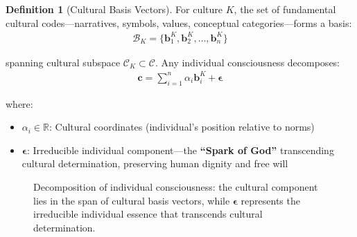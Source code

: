 \documentclass[11pt,a4paper]{article}
\theoremstyle{definition}
\newtheorem{definition}{Definition}[section]
\theoremstyle{remark}
\newcommand{\RR}{\mathbb{R}}
\newcommand{\CC}{\mathcal{C}}
\newcommand{\bb}{\mathbf{b}}
\newcommand{\cc}{\mathbf{c}}
\begin{document}
\begin{definition}[Cultural Basis Vectors]
For culture \(K\), the set of fundamental cultural codes—narratives, symbols, values, conceptual categories—forms a basis:
\begin{align}
\mathcal{B}_K = \{\bb_1^K, \bb_2^K, \ldots, \bb_n^K\}
\end{align}

spanning cultural subspace \(\CC_K \subset \CC\). Any individual consciousness decomposes:
\begin{align}
\cc = \sum_{i=1}^n \alpha_i \bb_i^K + \boldsymbol{\epsilon}
\end{align}

where:
\begin{itemize}
\item \(\alpha_i \in \RR\): Cultural coordinates (individual's position relative to norms)
\item \(\boldsymbol{\epsilon}\): Irreducible individual component—the \textbf{``Spark of God''} transcending cultural determination, preserving human dignity and free will
\end{itemize}
\end{definition}

\begin{figure}[H]
\centering
{}
\caption{Decomposition of individual consciousness: the cultural component lies in the span of cultural basis vectors, while \(\boldsymbol{\epsilon}\) represents the irreducible individual essence that transcends cultural determination.}
\label{fig:consciousness_decomposition}
\end{figure}
\end{document}
